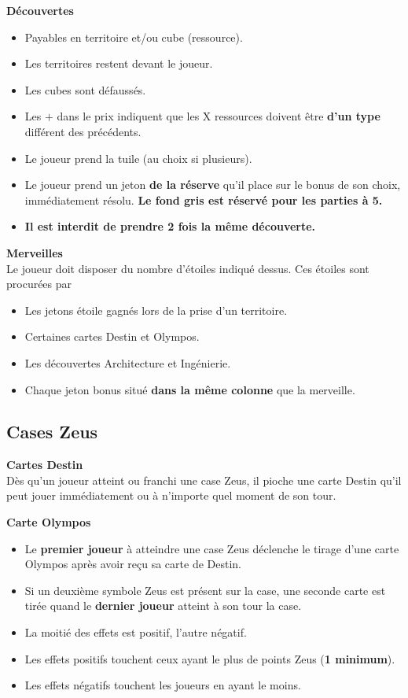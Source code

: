 \documentclass[10pt, a4paper]{article}	%
\begin{document}
\begin{multicols}{3}
\vspace{0.1cm}
\textbf{Découvertes}
\begin{itemize}
\item Payables en territoire et/ou cube (ressource).
\item Les territoires restent devant le joueur.
\item Les cubes sont défaussés.
\item Les \og $+$\fg{} dans le prix indiquent que les X ressources doivent être \textbf{d'un type} différent des précédents.
\item Le joueur prend la tuile (au choix si plusieurs).
\item Le joueur prend un jeton \textbf{de la réserve} qu'il place sur le bonus de son choix, immédiatement résolu. \textbf{Le fond gris est réservé pour les parties à 5.}
\item \textbf{Il est interdit de prendre 2 fois la même découverte.}
\end{itemize}


\vspace{0.1cm}
\textbf{Merveilles}\\
Le joueur doit disposer du nombre d'étoiles indiqué dessus. Ces étoiles sont
procurées par
\begin{itemize}
\item Les jetons étoile gagnés lors de la prise d'un territoire.
\item Certaines cartes Destin et Olympos.
\item Les découvertes Architecture et Ingénierie.
\item Chaque jeton bonus situé \textbf{dans la même colonne} que la merveille.
\end{itemize}


\subsection{Cases Zeus}
\textbf{Cartes Destin}\\
Dès qu'un joueur atteint ou franchi une case Zeus, il pioche une carte Destin qu'il peut jouer immédiatement ou à n'importe quel moment de son tour.

\vspace{0.1cm}
\textbf{Carte Olympos}
\begin{itemize}
\item Le \textbf{premier joueur} à atteindre une case Zeus déclenche le tirage d'une carte Olympos après avoir reçu sa carte de Destin.
\item Si un deuxième symbole Zeus est présent sur la case, une seconde carte est tirée quand le \textbf{dernier joueur} atteint à son tour la case.
\item La moitié des effets est positif, l'autre négatif.
\item Les effets positifs touchent ceux ayant le plus de points Zeus (\textbf{1 minimum}).
\item Les effets négatifs touchent les joueurs en ayant le moins.
\end{itemize}



\end{multicols}
\end{document}
